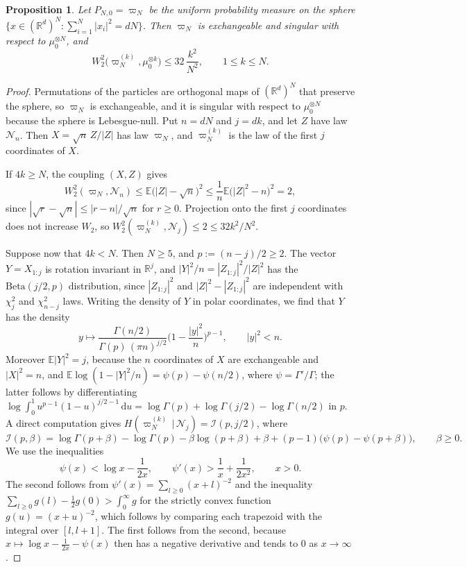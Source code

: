 \documentclass[11pt]{amsart}
\numberwithin{equation}{section}
\theoremstyle{plain}
\newtheorem{proposition}[theorem]{Proposition}
\theoremstyle{remark}
\newcommand{\R}{\mathbb{R}}
\newcommand{\E}{\mathbb{E}}
\newcommand{\cN}{\mathcal{N}}
\newcommand{\W}{W_2}
\newcommand{\dd}{\mathrm{d}}
\begin{document}
\begin{proposition}\label{prop:sphere}
Let $P_{N,0}=\varpi_N$ be the uniform probability measure on the sphere $\{x\in(\R^d)^N:\sum_{i=1}^N|x_i|^2=dN\}$. Then $\varpi_N$ is exchangeable and singular with respect to $\mu_0^{\otimes N}$, and
\begin{equation}\label{eq:sphere}
\W^2\big(\varpi_N^{(k)},\mu_0^{\otimes k}\big)\le32\,\frac{k^2}{N^2},\qquad 1\le k\le N.
\end{equation}
\end{proposition}

\begin{proof}
Permutations of the particles are orthogonal maps of $(\R^d)^N$ that preserve the sphere, so $\varpi_N$ is exchangeable, and it is singular with respect to $\mu_0^{\otimes N}$ because the sphere is Lebesgue-null. Put $n=dN$ and $j=dk$, and let $Z$ have law $\cN_n$. Then $X=\sqrt n\,Z/|Z|$ has law $\varpi_N$, and $\varpi_N^{(k)}$ is the law of the first $j$ coordinates of $X$.

If $4k\ge N$, the coupling $(X,Z)$ gives
\[
\W^2(\varpi_N,\cN_n)\le\E\big(|Z|-\sqrt n\big)^2\le\frac1n\E\big(|Z|^2-n\big)^2=2,
\]
since $|\sqrt r-\sqrt n|\le|r-n|/\sqrt n$ for $r\ge0$. Projection onto the first $j$ coordinates does not increase $\W$, so $\W^2(\varpi_N^{(k)},\cN_j)\le2\le32k^2/N^2$.

Suppose now that $4k<N$. Then $N\ge5$, and $p:=(n-j)/2\ge2$. The vector $Y=X_{1:j}$ is rotation invariant in $\R^j$, and $|Y|^2/n=|Z_{1:j}|^2/|Z|^2$ has the $\mathrm{Beta}(j/2,p)$ distribution, since $|Z_{1:j}|^2$ and $|Z|^2-|Z_{1:j}|^2$ are independent with $\chi^2_j$ and $\chi^2_{n-j}$ laws. Writing the density of $Y$ in polar coordinates, we find that $Y$ has the density
\[
y\mapsto\frac{\Gamma(n/2)}{\Gamma(p)\,(\pi n)^{j/2}}\Big(1-\frac{|y|^2}n\Big)^{p-1},\qquad |y|^2<n.
\]
Moreover $\E|Y|^2=j$, because the $n$ coordinates of $X$ are exchangeable and $|X|^2=n$, and $\E\log(1-|Y|^2/n)=\psi(p)-\psi(n/2)$, where $\psi=\Gamma'/\Gamma$; the latter follows by differentiating $\log\int_0^1u^{p-1}(1-u)^{j/2-1}\,\dd u=\log\Gamma(p)+\log\Gamma(j/2)-\log\Gamma(n/2)$ in $p$. A direct computation gives $H(\varpi_N^{(k)}\,|\,\cN_j)=\mathcal I(p,j/2)$, where
\[
\mathcal I(p,\beta)=\log\Gamma(p+\beta)-\log\Gamma(p)-\beta\log(p+\beta)+\beta+(p-1)\big(\psi(p)-\psi(p+\beta)\big),\qquad\beta\ge0.
\]
We use the inequalities
\begin{equation}\label{eq:digamma}
\psi(x)<\log x-\frac1{2x},\qquad \psi'(x)>\frac1x+\frac1{2x^2},\qquad x>0.
\end{equation}
The second follows from $\psi'(x)=\sum_{l\ge0}(x+l)^{-2}$ \cite[Section~5.15]{DLMF} and the inequality $\sum_{l\ge0}g(l)-\frac12g(0)>\int_0^\infty g$ for the strictly convex function $g(u)=(x+u)^{-2}$, which follows by comparing each trapezoid with the integral over $[l,l+1]$. The first follows from the second, because $x\mapsto\log x-\frac1{2x}-\psi(x)$ then has a negative derivative and tends to $0$ as $x\to\infty$ \cite[Section~5.11]{DLMF}.


\end{proof}
\end{document}
